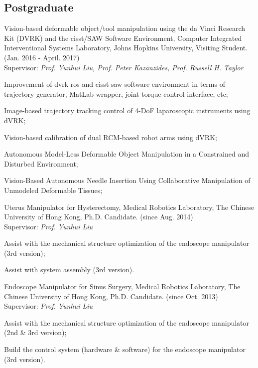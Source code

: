 \documentclass[10pt,letterpaper]{article}
\renewenvironment{itemize}{
\begin{list}{}{
    \setlength{\leftmargin}{1.5em}
    \setlength{\itemsep}{0.25em}
    \setlength{\parskip}{0pt}
    \setlength{\parsep}{0.25em}
    }
    }{
\end{list}
}
\begin{document}
\subsection*{Postgraduate}
\begin{itemize}
    \item Vision-based deformable object/tool manipulation using the da Vinci Research Kit (DVRK) and the cisst/SAW Software Environment, Computer Integrated Interventional Systems Laboratory, Johns Hopkins University, Visiting Student. (Jan. 2016 - April. 2017) \\
    Supervisor: \textit{Prof. Yunhui Liu, Prof. Peter Kazanzides, Prof. Russell H. Taylor}
    \begin{itemize}
        \item Improvement of dvrk-ros and cisst-saw software environment in terms of trajectory generator, MatLab wrapper, joint torque control interface, etc;
        \item Image-based trajectory tracking control of 4-DoF laparoscopic instruments using dVRK;
        \item Vision-based calibration of dual RCM-based robot arms using dVRK;
        \item Autonomous Model-Less Deformable Object Manipulation in a Constrained and Disturbed Environment;
        \item Vision-Based Autonomous Needle Insertion Using Collaborative Manipulation of Unmodeled Deformable Tissues;
    \end{itemize}

    \item Uterus Manipulator for Hysterectomy, Medical Robotics Laboratory, The Chinese University of Hong Kong, Ph.D. Candidate. (since Aug. 2014) \\
    Supervisor: \textit{Prof. Yunhui Liu}
    \begin{itemize}
        \item Assist with the mechanical structure optimization of the endoscope manipulator (3rd version);
        \item Assist with system assembly (3rd version).
    \end{itemize}

    \item Endoscope Manipulator for Sinus Surgery, Medical Robotics Laboratory, The Chinese University of Hong Kong, Ph.D. Candidate. (since Oct. 2013) \\
    Supervisor: \textit{Prof. Yunhui Liu}
    \begin{itemize}
        \item Assist with the mechanical structure optimization of the endoscope manipulator (2nd \& 3rd version);
        \item Build the control system (hardware \& software) for the endoscope manipulator (3rd version).
    \end{itemize}


\end{itemize}
\end{document}
